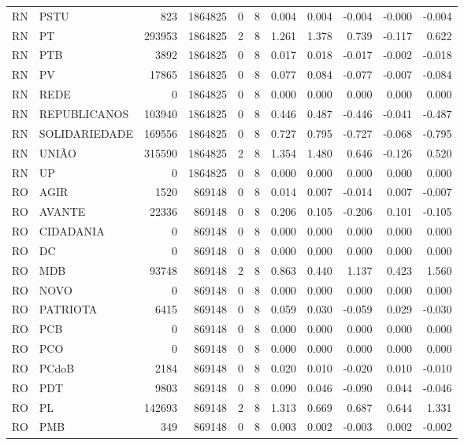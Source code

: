\begin{landscape}
\begin{longtable}{llrrrrrrrrr}
RN & PSTU & 823 & 1864825 & 0 & 8 & 0.004 & 0.004 & -0.004 & -0.000 & -0.004 \\
RN & PT & 293953 & 1864825 & 2 & 8 & 1.261 & 1.378 & 0.739 & -0.117 & 0.622 \\
RN & PTB & 3892 & 1864825 & 0 & 8 & 0.017 & 0.018 & -0.017 & -0.002 & -0.018 \\
RN & PV & 17865 & 1864825 & 0 & 8 & 0.077 & 0.084 & -0.077 & -0.007 & -0.084 \\
RN & REDE & 0 & 1864825 & 0 & 8 & 0.000 & 0.000 & 0.000 & 0.000 & 0.000 \\
RN & REPUBLICANOS & 103940 & 1864825 & 0 & 8 & 0.446 & 0.487 & -0.446 & -0.041 & -0.487 \\
RN & SOLIDARIEDADE & 169556 & 1864825 & 0 & 8 & 0.727 & 0.795 & -0.727 & -0.068 & -0.795 \\
RN & UNIÃO & 315590 & 1864825 & 2 & 8 & 1.354 & 1.480 & 0.646 & -0.126 & 0.520 \\
RN & UP & 0 & 1864825 & 0 & 8 & 0.000 & 0.000 & 0.000 & 0.000 & 0.000 \\
RO & AGIR & 1520 & 869148 & 0 & 8 & 0.014 & 0.007 & -0.014 & 0.007 & -0.007 \\
RO & AVANTE & 22336 & 869148 & 0 & 8 & 0.206 & 0.105 & -0.206 & 0.101 & -0.105 \\
RO & CIDADANIA & 0 & 869148 & 0 & 8 & 0.000 & 0.000 & 0.000 & 0.000 & 0.000 \\
RO & DC & 0 & 869148 & 0 & 8 & 0.000 & 0.000 & 0.000 & 0.000 & 0.000 \\
RO & MDB & 93748 & 869148 & 2 & 8 & 0.863 & 0.440 & 1.137 & 0.423 & 1.560 \\
RO & NOVO & 0 & 869148 & 0 & 8 & 0.000 & 0.000 & 0.000 & 0.000 & 0.000 \\
RO & PATRIOTA & 6415 & 869148 & 0 & 8 & 0.059 & 0.030 & -0.059 & 0.029 & -0.030 \\
RO & PCB & 0 & 869148 & 0 & 8 & 0.000 & 0.000 & 0.000 & 0.000 & 0.000 \\
RO & PCO & 0 & 869148 & 0 & 8 & 0.000 & 0.000 & 0.000 & 0.000 & 0.000 \\
RO & PCdoB & 2184 & 869148 & 0 & 8 & 0.020 & 0.010 & -0.020 & 0.010 & -0.010 \\
RO & PDT & 9803 & 869148 & 0 & 8 & 0.090 & 0.046 & -0.090 & 0.044 & -0.046 \\
RO & PL & 142693 & 869148 & 2 & 8 & 1.313 & 0.669 & 0.687 & 0.644 & 1.331 \\
RO & PMB & 349 & 869148 & 0 & 8 & 0.003 & 0.002 & -0.003 & 0.002 & -0.002 \\

\end{longtable}
\end{landscape}
